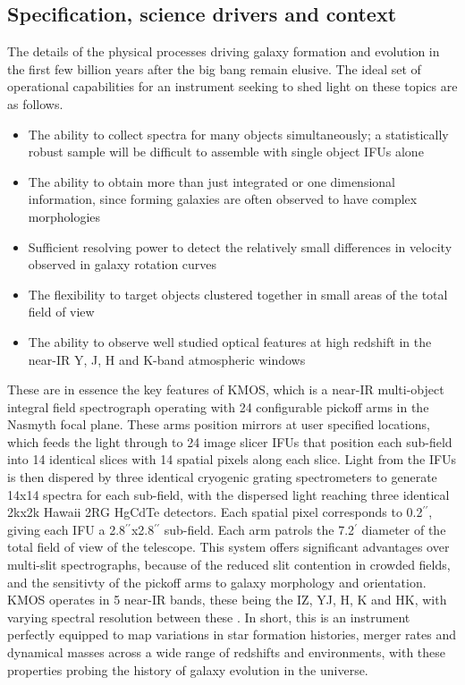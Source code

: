 \documentclass{literature}
\begin{document}
\subsection{Specification, science drivers and context}\label{subsec:instrument}
The details of the physical processes driving galaxy formation and evolution in the first few billion years after the big bang remain elusive. The ideal set of operational capabilities for an instrument seeking to shed light on these topics are as follows. 
\begin{itemize}
	\item The ability to collect spectra for many objects simultaneously; a statistically robust sample will be difficult to assemble with single object IFUs alone 
	\item The ability to obtain more than just integrated or one dimensional information, since forming galaxies are often observed to have complex morphologies 
	\item Sufficient resolving power to detect the relatively small differences in velocity observed in galaxy rotation curves
	\item The flexibility to target objects clustered together in small areas of the total field of view 
	\item The ability to observe well studied optical features at high redshift in the near-IR Y, J, H and K-band atmospheric windows    
\end{itemize}

These are in essence the key features of KMOS, which is a near-IR multi-object integral field spectrograph operating with 24 configurable pickoff arms in the Nasmyth focal plane. These arms position mirrors at user specified locations, which feeds the light through to 24 image slicer IFUs that position each sub-field into 14 identical slices with 14 spatial pixels along each slice. Light from the IFUs is then dispered by three identical cryogenic grating spectrometers to generate 14x14 spectra for each sub-field, with the dispersed light reaching three identical 2kx2k Hawaii 2RG HgCdTe detectors. Each spatial pixel corresponds to 0.2$^{\prime \prime}$, giving each IFU a 2.8$^{\prime \prime}$x2.8$^{\prime \prime}$ sub-field. Each arm patrols the 7.2$^{\prime}$ diameter of the total field of view of the telescope. This system offers significant advantages over multi-slit spectrographs, because of the reduced slit contention in crowded fields, and the sensitivty of the pickoff arms to galaxy morphology and orientation. KMOS operates in 5 near-IR bands, these being the IZ, YJ, H, K and HK, with varying spectral resolution between these \citep{Sharples2005}. In short, this is an instrument perfectly equipped to map variations in star formation histories, merger rates and dynamical masses across a wide range of redshifts and environments, with these properties probing the history of galaxy evolution in the universe. \\ 
\end{document}
